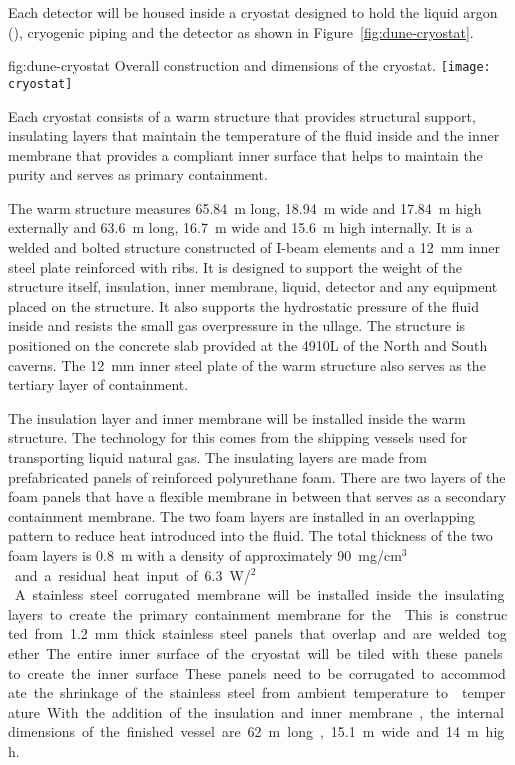 Each detector will be housed inside a cryostat designed to hold the
liquid argon (), cryogenic piping and the detector as shown in
Figure~\ref{fig:dune-cryostat}.
\begin{dunefigure}{fig:dune-cryostat}
  {Overall construction and dimensions of the  cryostat.}
  \texttt{[image: cryostat]}
\end{dunefigure}
Each cryostat consists of a warm structure that provides structural
support, insulating layers that maintain the temperature of the fluid
inside and the inner membrane that provides a compliant inner surface
that helps to maintain the  purity and serves as primary
containment.

The warm structure measures \SI{65.84}{\meter} long,
\SI{18.94}{\meter} wide and \SI{17.84}{\meter} high externally and
\SI{63.6}{\meter} long, \SI{16.7}{\meter} wide and \SI{15.6}{\meter}
high internally.  It is a welded and bolted structure constructed of
I-beam elements and a \SI{12}{\mm} inner steel plate reinforced with
ribs.  It is designed to support the
weight of the structure itself, 
insulation, inner membrane, liquid, detector and any equipment placed
on the structure.  It also supports the hydrostatic pressure of the
fluid inside and resists the small gas overpressure in the ullage.
The structure is positioned on the concrete slab provided at the 4910L
of the North and South caverns.  The \SI{12}{\mm} inner steel plate of the
warm structure also serves as the tertiary layer of containment.

The insulation layer and inner membrane will be installed inside the
warm structure.  The technology for this comes from the shipping
vessels used for transporting liquid natural gas. The insulating
layers are made from prefabricated panels of reinforced polyurethane
foam.  There are two layers of the foam panels that have a flexible
membrane in between that serves as a secondary containment membrane.
The two foam layers are installed in an overlapping pattern to reduce
heat introduced into the fluid.  The total thickness of the two foam
layers is \SI{0.8}{\meter} with a density of approximately
\SI{90}{mg/cm$^3$} and a residual heat input of
\SI{6.3}{W/\meter$^2$}.  A stainless steel corrugated membrane will be
installed inside the insulating layers to create the primary
containment membrane for the .  This is constructed from \SI{1.2}{\mm}
thick stainless steel panels that overlap and are welded together.
The entire inner surface of the cryostat will be tiled with these
panels to create the inner surface.  These panels need to be
corrugated to accommodate the shrinkage of the stainless steel from
ambient temperature to  temperature.  With the addition of the
insulation and inner membrane, the internal dimensions of the finished
vessel are \SI{62}{\meter} long, \SI{15.1}{\meter} wide and
\SI{14}{\meter} high.

